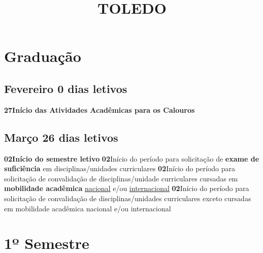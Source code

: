\documentclass[thesis]{hmcposter}
\author{ }
\title{TOLEDO}
\begin{document}
\begin{poster}
\normalsize\section{\color{hmcorange}Graduação}\subsection{Fevereiro \hfill 0 dias letivos}\textbf{27}\qquad \textbf{Início das Atividades Acadêmicas para os Calouros} \newline \null\subsection{Março \hfill 26 dias letivos}\textbf{02}\qquad \textbf{Início do semestre letivo} \newline \null\textbf{02}\qquad Início do período para solicitação de \textbf{exame de suficiência} em disciplinas/unidades curriculares \newline \null\textbf{02}\qquad Início do período para solicitação de convalidação de disciplinas/unidade curriculares cursadas em \textbf{mobilidade acadêmica} \underline{nacional} e/ou \underline{internacional} \newline \null\textbf{02}\qquad Início do período para solicitação de convalidação de disciplinas/unidades curriculares exceto cursadas em mobilidade acadêmica nacional e/ou internacional \newline \null\vfill\null
\columnbreak
\section{\hfill \color{hmcorange}1º Semestre}

\end{poster}
\end{document}
